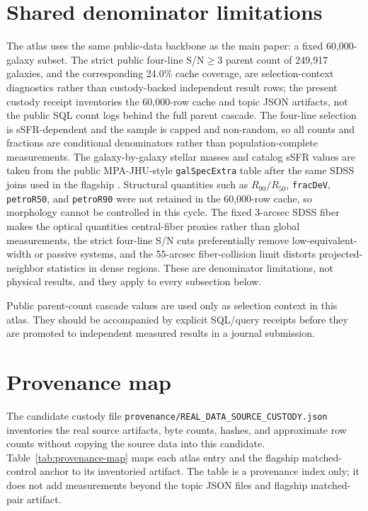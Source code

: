 \documentclass[twocolumn]{aastex631}
\begin{document}
\section{Shared denominator limitations}
The atlas uses the same public-data backbone as the main paper: a fixed 60,000-galaxy subset. The strict public four-line S/N$\geq3$ parent count of 249,917 galaxies, and the corresponding 24.0\% cache coverage, are selection-context diagnostics rather than custody-backed independent result rows; the present custody receipt inventories the 60,000-row cache and topic JSON artifacts, not the public SQL count logs behind the full parent cascade. The four-line selection is sSFR-dependent and the sample is capped and non-random, so all counts and fractions are conditional denominators rather than population-complete measurements. The galaxy-by-galaxy stellar masses and catalog sSFR values are taken from the public MPA-JHU-style \texttt{galSpecExtra} table after the same SDSS joins used in the flagship \citep{sdssdr17,brinchmann2004,york2000}. Structural quantities such as \(R_{90}/R_{50}\), \texttt{fracDeV}, \texttt{petroR50}, and \texttt{petroR90} were not retained in the 60,000-row cache, so morphology cannot be controlled in this cycle. The fixed 3-arcsec SDSS fiber makes the optical quantities central-fiber proxies rather than global measurements, the strict four-line S/N cuts preferentially remove low-equivalent-width or passive systems, and the 55-arcsec fiber-collision limit distorts projected-neighbor statistics in dense regions. These are denominator limitations, not physical results, and they apply to every subsection below.

Public parent-count cascade values are used only as selection context in this atlas. They should be accompanied by explicit SQL/query receipts before they are promoted to independent measured results in a journal submission.

\section{Provenance map}
The candidate custody file \texttt{provenance/REAL\_DATA\_SOURCE\_CUSTODY.json} inventories the real source artifacts, byte counts, hashes, and approximate row counts without copying the source data into this candidate. Table~\ref{tab:provenance-map} maps each atlas entry and the flagship matched-control anchor to its inventoried artifact. The table is a provenance index only; it does not add measurements beyond the topic JSON files and flagship matched-pair artifact.
\end{document}
